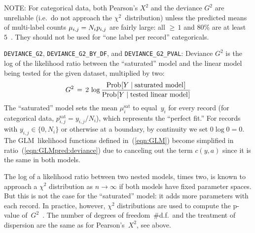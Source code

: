NOTE: For categorical data, both Pearson's $X^2$ and the deviance $G^2$ are unreliable (i.e.\ do not
approach the $\chi^2$~distribution) unless the predicted means of multi-label counts
$\mu_{i,j} = N_i \hspace{0.5pt} p_{i,j}$ are fairly large: all ${\geq}\,1$ and 80\% are
at least~$5$~\cite{Cochran1954:chisq}.  They should not be used for ``one label per record'' categoricals.

\smallskip
{\tt DEVIANCE\_G2}, {\tt DEVIANCE\_G2\_BY\_DF}, and {\tt DEVIANCE\_G2\_PVAL}:
Deviance $G^2$ is the log of the likelihood ratio between the ``saturated'' model and the
linear model being tested for the given dataset, multiplied by two:
\begin{equation}
G^2 \,=\, 2 \,\log \frac{\Prob[Y \mid \textrm{saturated model}\hspace{0.5pt}]}%
{\Prob[Y \mid \textrm{tested linear model}\hspace{0.5pt}]}
\label{eqn:GLMpred:deviance}
\end{equation}
The ``saturated'' model sets the mean $\mu_i^{\mathrm{sat}}$ to equal~$y_i$ for every record
(for categorical data, $p^{\mathrm{sat}}_{i,j} = y_{i,j} / N_i$), which represents the ``perfect fit.''
For records with $y_{i,j} \in \{0, N_i\}$ or otherwise at a boundary, by continuity we set
$0 \log 0 = 0$.  The GLM~likelihood functions defined in~(\ref{eqn:GLM}) become simplified
in ratio~(\ref{eqn:GLMpred:deviance}) due to canceling out the term $c(y, a)$ since it is the same
in both models.

The log of a likelihood ratio between two nested models, times two, is known to approach
a $\chi^2$ distribution as $n\to\infty$ if both models have fixed parameter spaces.  
But this is not the case for the ``saturated'' model: it adds more parameters with each record.  
In practice, however, $\chi^2$ distributions are used to compute the p-value of~$G^2$~\cite{McCullagh1989:GLM}.  
The number of degrees of freedom~\#d.f.\ and the treatment of dispersion are the same as for
Pearson's~$X^2$, see above.

